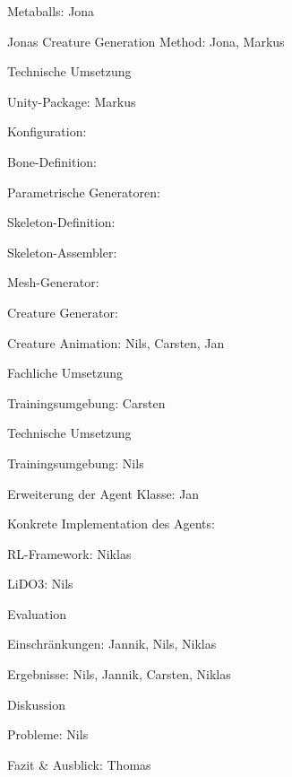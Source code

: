 \begin{thallok}
\begin{thallok}
\begin{thallok}
\begin{thallok}
					\item Metaballs: Jona
					\item Jonas Creature Generation Method: Jona, Markus
				\end{thallok}
			\item Technische Umsetzung
				\begin{thallok}
					\item Unity-Package: Markus
					\item Konfiguration:
					\item Bone-Definition: 
					\item Parametrische Generatoren: 
					\item Skeleton-Definition: 
					\item Skeleton-Assembler:
					\item Mesh-Generator:
					\item Creature Generator:
				\end{thallok}
		\end{thallok}
		\item Creature Animation: Nils, Carsten, Jan
		\begin{thallok}
			\item Fachliche Umsetzung
				\begin{thallok}
					\item Trainingsumgebung: Carsten
				\end{thallok}
			\item Technische Umsetzung
				\begin{thallok}
					\item Trainingsumgebung: Nils
					\item Erweiterung der Agent Klasse: Jan
					\item Konkrete Implementation des Agents:
					\item RL-Framework: Niklas
					\item LiDO3: Nils
				\end{thallok}
		\end{thallok}
	\end{thallok}
	\item Evaluation
	\begin{thallok}
		\item Einschränkungen: Jannik, Nils, Niklas
		\item Ergebnisse: Nils, Jannik, Carsten, Niklas
		\item Diskussion
		\item Probleme: Nils
	\end{thallok}
	\item Fazit \& Ausblick: Thomas
\end{thallok}

